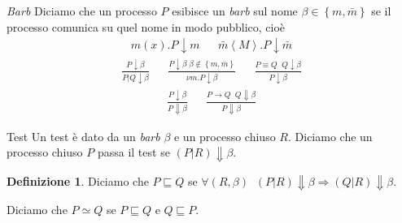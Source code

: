 \documentclass{beamer}
\newcounter{counter1}
\theoremstyle{plain}
\theoremstyle{definition}
\newtheorem{mydef}[counter1]{Definizione}
\theoremstyle{remark}
\newcommand{\set}[1]{\left\{#1\right\}}
\newcommand{\ang}[1]{\left<#1\right>}
\begin{document}
\begin{frame}{\textit{Barb}}
  Diciamo che un processo $P$ esibisce un \textit{barb} sul nome
  $\beta \in \set{m,\bar m}$ se il processo comunica su quel nome in
  modo pubblico, cioè
  \begin{align*}
    m(x).P \downarrow m & & \bar m \ang{M}.P \downarrow \bar m 
  \end{align*}
  \begin{align*}
    \frac{P\downarrow \beta}{ P|Q \downarrow \beta} & &
                                                        \frac{P\downarrow
                                                        \beta\; \beta
                                                      \not\in \set{m,
                                                      \bar m}}{ \nu
                                                      m. P \downarrow
                                                      \beta} & & \frac{
                                                               P
                                                               \equiv
                                                               Q \;\; Q
                                                               \downarrow
                                                               \beta}
                                                               {
                                                               P\downarrow
                                                               \beta}
  \end{align*}
  \begin{align*}
    \frac{P\downarrow \beta}{P\Downarrow \beta} & & \frac{P\rightarrow
                                                    Q\;\; Q \Downarrow
                                                    \beta }{P
                                                    \Downarrow \beta}
  \end{align*}
\end{frame}

\begin{frame}{Test}
  Un test è dato da un \textit{barb} $\beta$ e un processo chiuso
  $R$. Diciamo che un processo chiuso $P$ passa il test se $(P|R)
  \Downarrow \beta$.
  \vfill

  \begin{mydef}
    Diciamo che $P \sqsubseteq Q$ se
    $\forall (R,\beta)\;\; (P|R)\Downarrow \beta \Rightarrow
    (Q|R)\Downarrow \beta$.

    Diciamo che $P \simeq Q$ se $P \sqsubseteq Q$ e $Q \sqsubseteq P$.
  \end{mydef}
\end{frame}
\end{document}
